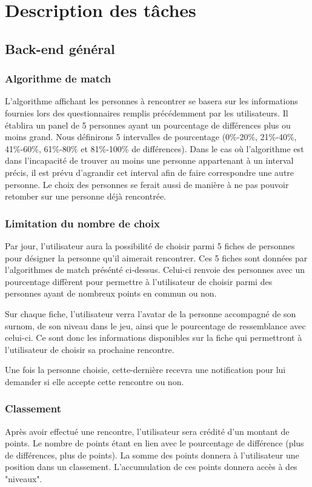 \documentclass[10pt]{article}
\begin{document}
 \section{Description des tâches} 
   
  \subsection{Back-end général}
   \subsubsection{Algorithme de match}
    L’algorithme affichant les personnes à rencontrer se basera sur les informations fournies lors des questionnaires remplis précédemment
    par les utilisateurs. 
    Il établira un panel de 5 personnes ayant un pourcentage de différences plus ou moins grand.
    Nous définirons 5 intervalles de pourcentage (0\%-20\%, 21\%-40\%, 41\%-60\%, 61\%-80\% et 81\%-100\% de différences).   
    Dans le cas où l’algorithme est dans l’incapacité de trouver au moins une personne appartenant à un interval précis,
    il est prévu d’agrandir cet interval afin de faire correspondre une autre personne.
    Le choix des personnes se ferait aussi de manière à ne pas pouvoir retomber sur une personne déjà rencontrée. 
   \subsubsection{Limitation du nombre de choix}
    Par jour, l'utilisateur aura la possibilité de choisir parmi 5 fiches de personnes pour désigner la personne qu'il aimerait rencontrer. 
    Ces 5 fiches sont données par l'algorithmes de match présénté ci-dessus. 
    Celui-ci renvoie des personnes avec un pourcentage diffèrent pour permettre à l'utilisateur de choisir parmi des personnes ayant de 
    nombreux points en commun ou non.

    Sur chaque fiche, l'utilisateur verra l'avatar de la personne accompagné de son surnom, de son niveau dans le jeu, ainsi que le 
    pourcentage de ressemblance avec celui-ci.
    Ce sont donc les informations disponibles sur la fiche qui permettront à l'utilisateur de choisir sa prochaine rencontre.

    Une fois la personne choisie, cette-dernière recevra une notification pour lui demander si elle accepte cette rencontre ou non.
   \subsubsection{Classement}
    Après avoir effectué une rencontre, l'utilisateur sera crédité d'un montant de points. Le nombre de points étant en lien avec le
    pourcentage de différence (plus de différences, plus de points). La somme des points donnera à l'utilisateur une position dans 
    un classement. L'accumulation de ces points donnera accès à des "niveaux".
\end{document}
